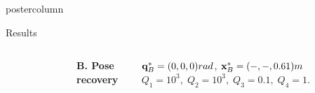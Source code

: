 \documentclass{beamer}
\begin{document}
\begin{frame}
\begin{columns}
\begin{column}{.4\textwidth}
\begin{beamercolorbox}[center]{postercolumn}
\begin{minipage}{.98\textwidth}
{\begin{myblock}{Results}
\begin{columns}
\begin{figure}[h!]
	   \label{fig:rearing_behaviour}
	\end{figure}
	
	\begin{center}
	\textbf{B. Pose recovery}\\
	\vspace*{5mm}
	\end{center}
	\vspace*{-4mm}
	$\mathbf{q}^{*}_{B}= (0,0,0)rad$, $\mathbf{x}^{*}_{B}= (-,-, 0.61)m$ 
	$Q_{1} = 10^3, \; Q_{2} = 10^3, \; Q_{3} = 0.1, \; Q_{4} = 1$.
	\begin{center}
	\end{center}


\end{columns}
\end{myblock}}
\end{minipage}
\end{beamercolorbox}
\end{column}
\end{columns}
\end{frame}
\end{document}
